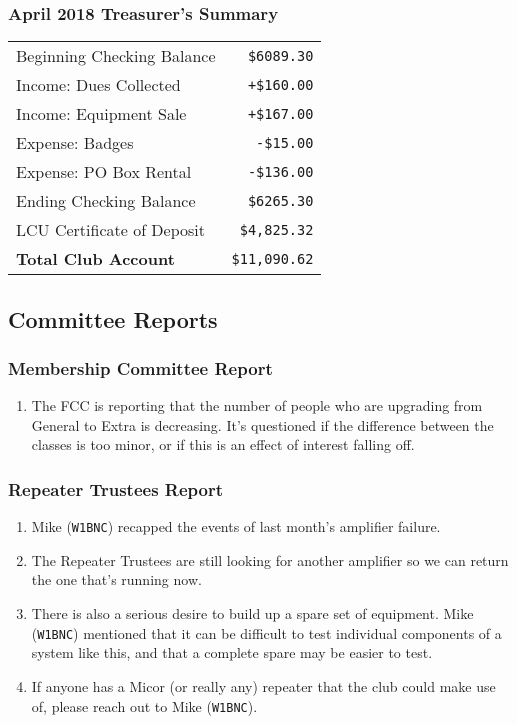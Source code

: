 \documentclass[10pt,letterpaper]{article}
\begin{document}
\subsubsection{April 2018 Treasurer's Summary}
\noindent
\begin{tabular}{|l|r|}
  \hline
  Beginning Checking Balance & \texttt{\$6089.30} \\
  Income: Dues Collected & \texttt{+\$160.00} \\
  Income: Equipment Sale & \texttt{+\$167.00} \\
  Expense: Badges & \texttt{-\$15.00} \\
  Expense: PO Box Rental & \texttt{-\$136.00} \\
  Ending Checking Balance & \texttt{\$6265.30} \\
  \hline
  \hline
  LCU Certificate of Deposit & \texttt{\$4,825.32} \\
  \hline
  \hline
  \textbf{Total Club Account} & \texttt{\$11,090.62} \\
  \hline
\end{tabular}

\subsection{Committee Reports}

\subsubsection{Membership Committee Report}
\begin{enumerate}
  \item The FCC is reporting that the number of people who are upgrading from General to Extra is decreasing. It's questioned if the difference between the classes is too minor, or if this is an effect of interest falling off.
\end{enumerate}

\subsubsection{Repeater Trustees Report}
\begin{enumerate}
  \item Mike (\texttt{W1BNC}) recapped the events of last month's amplifier failure.
  \item The Repeater Trustees are still looking for another amplifier so we can return the one that's running now.
  \item There is also a serious desire to build up a spare set of equipment. Mike (\texttt{W1BNC}) mentioned that it can be difficult to test individual components of a system like this, and that a complete spare may be easier to test.
  \item If anyone has a Micor (or really any) repeater that the club could make use of, please reach out to Mike (\texttt{W1BNC}).
\end{enumerate}
\end{document}

